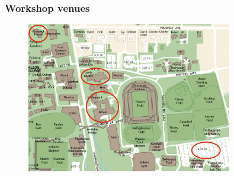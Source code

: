 \begin{frame}
\frametitle{Workshop venues}

\begin{figure}[htbp]
\begin{center}
\includegraphics[width=0.8\textwidth]{images/PU-map-venues.jpeg}
\end{center}
\end{figure}

\end{frame}


